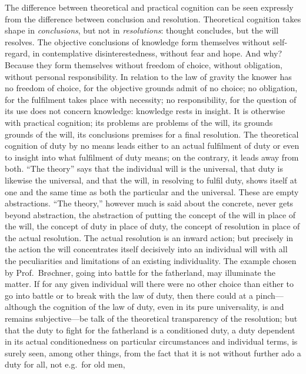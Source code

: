 \documentclass[12pt]{book}
\newcommand{\opage}[1]{\marginnote{\footnotesize\textit{[#1]}}}
\begin{document}
The difference between theoretical and practical cognition can be seen
expressly from the difference between conclusion and resolution.
Theoretical cognition takes shape in \emph{conclusions}, but not in
\emph{resolutions}: thought concludes, but the will resolves. The objective
conclusions of knowledge form themselves without self-regard, in
contemplative disinterestedness, without fear and hope. And why? Because
they form themselves without freedom of choice, without obligation,
without personal responsibility. In relation to the law of gravity the
knower has no freedom of choice, for the objective grounds admit of no
choice; no obligation, for
\opage{34}\setcounter{footnote}{0}%
the fulfilment takes place with necessity; no responsibility, for the
question of its use does not concern knowledge: knowledge rests in
insight. It is otherwise with practical cognition; its problems are
problems of the will, its grounds grounds of the will, its conclusions
premises for a final resolution. The theoretical cognition of duty by no
means leads either to an actual fulfilment of duty or even to insight into
what fulfilment of duty means; on the contrary, it leads away from both.
``The theory'' says that the individual will is the universal, that duty
is likewise the universal, and that the will, in resolving to fulfil
duty, shows itself at one and the same time as both the particular and the
universal. These are empty abstractions. ``The theory,'' however much is
said about the concrete, never gets beyond abstraction, the abstraction of
putting the concept of the will in place of the will, the concept of duty
in place of duty, the concept of resolution in place of the actual
resolution. The actual resolution is an inward action; but precisely in
the action the will concentrates itself decisively into an individual will
with all the peculiarities and limitations of an existing individuality.
The example chosen by Prof.~Brøchner, going into battle for the
fatherland, may illuminate the matter. If for any given individual will
there were no other choice than either to go into battle or to break with
the law of duty, then there could at a pinch---although the cognition of
the law of duty, even in its pure universality, is and remains
subjective---be talk of the theoretical transparency of the resolution;
but that the duty to fight for the fatherland is a conditioned duty, a
duty dependent in its actual conditionedness on particular circumstances
and individual terms, is surely seen, among other things, from the fact
that it is not without further ado a duty for all, not e.g.\ for old men,
\end{document}
